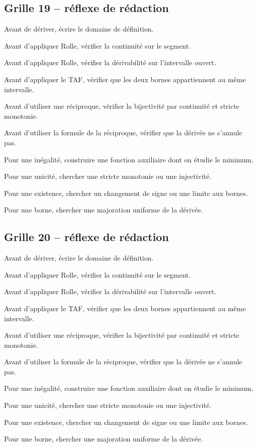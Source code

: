 \documentclass[11pt,a4paper]{article}
\begin{document}
\subsection*{Grille 19 -- réflexe de rédaction}

\begin{methodebox}

Avant de dériver, écrire le domaine de définition.

Avant d'appliquer Rolle, vérifier la continuité sur le segment.

Avant d'appliquer Rolle, vérifier la dérivabilité sur l'intervalle ouvert.

Avant d'appliquer le TAF, vérifier que les deux bornes appartiennent au même intervalle.

Avant d'utiliser une réciproque, vérifier la bijectivité par continuité et stricte monotonie.

Avant d'utiliser la formule de la réciproque, vérifier que la dérivée ne s'annule pas.

Pour une inégalité, construire une fonction auxiliaire dont on étudie le minimum.

Pour une unicité, chercher une stricte monotonie ou une injectivité.

Pour une existence, chercher un changement de signe ou une limite aux bornes.

Pour une borne, chercher une majoration uniforme de la dérivée.

\end{methodebox}

\subsection*{Grille 20 -- réflexe de rédaction}

\begin{methodebox}

Avant de dériver, écrire le domaine de définition.

Avant d'appliquer Rolle, vérifier la continuité sur le segment.

Avant d'appliquer Rolle, vérifier la dérivabilité sur l'intervalle ouvert.

Avant d'appliquer le TAF, vérifier que les deux bornes appartiennent au même intervalle.

Avant d'utiliser une réciproque, vérifier la bijectivité par continuité et stricte monotonie.

Avant d'utiliser la formule de la réciproque, vérifier que la dérivée ne s'annule pas.

Pour une inégalité, construire une fonction auxiliaire dont on étudie le minimum.

Pour une unicité, chercher une stricte monotonie ou une injectivité.

Pour une existence, chercher un changement de signe ou une limite aux bornes.

Pour une borne, chercher une majoration uniforme de la dérivée.

\end{methodebox}
\end{document}
